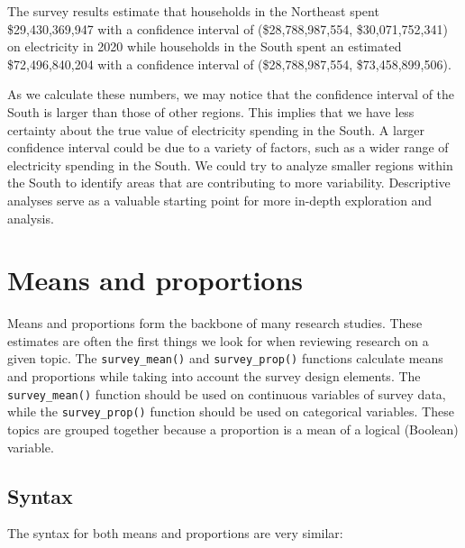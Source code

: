 \documentclass[
]{krantz}
\begin{document}
The survey results estimate that households in the Northeast spent \$29,430,369,947 with a confidence interval of (\$28,788,987,554, \$30,071,752,341) on electricity in 2020 while households in the South spent an estimated \$72,496,840,204 with a confidence interval of (\$28,788,987,554, \$73,458,899,506).

As we calculate these numbers, we may notice that the confidence interval of the South is larger than those of other regions. This implies that we have less certainty about the true value of electricity spending in the South. A larger confidence interval could be due to a variety of factors, such as a wider range of electricity spending in the South. We could try to analyze smaller regions within the South to identify areas that are contributing to more variability. Descriptive analyses serve as a valuable starting point for more in-depth exploration and analysis.

\hypertarget{desc-meanprop}{%
\section{Means and proportions}\label{desc-meanprop}}

Means and proportions form the backbone of many research studies. These estimates are often the first things we look for when reviewing research on a given topic. The \texttt{survey\_mean()} and \texttt{survey\_prop()} functions calculate means and proportions while taking into account the survey design elements. The \texttt{survey\_mean()} function should be used on continuous variables of survey data, while the \texttt{survey\_prop()} function should be used on categorical variables. These topics are grouped together because a proportion is a mean of a logical (Boolean) variable.

\hypertarget{desc-meanprop-syntax}{%
\subsection{Syntax}\label{desc-meanprop-syntax}}

The syntax for both means and proportions are very similar:
\end{document}
